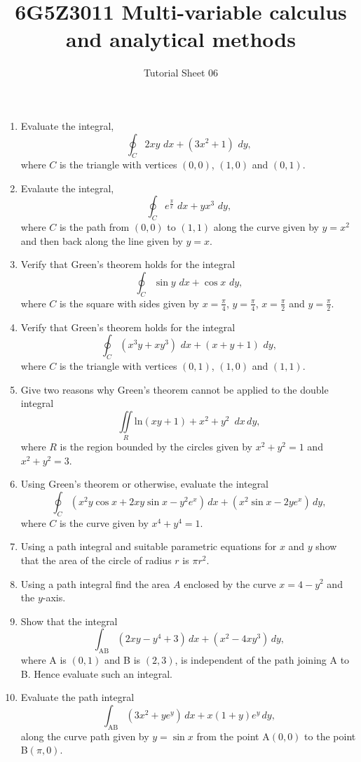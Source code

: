 \documentclass[a4paper]{amsart}
\begin{document}
\title{6G5Z3011 Multi-variable calculus and analytical methods}
\author{Tutorial Sheet 06}
\maketitle

\begin{enumerate}
    \item
    Evaluate the integral,
    $$ \oint_{C} 2xy \, \, dx + \left ( 3x^2 + 1 \right ) \, \, dy ,$$
    where $C$ is the triangle with vertices $(0,0)$, $(1,0)$ and $(0,1)$.
    \item
    Evalaute the integral,
    $$ \oint_{C} e^{\frac{y}{x}}  \, \, dx + y x^3 \, \, dy ,$$
    where $C$ is the path from $(0,0)$ to $(1,1)$ along the curve given by $y=x^2$ and then back along the line given by $y=x$.
    \item
    Verify that Green's theorem holds for the integral
    $$ \oint_{C} \sin y \, \, dx + \cos x \, \, dy ,$$
    where $C$ is the square with sides given by $x=\frac{\pi}{4}$, $y=\frac{\pi}{4}$, $x=\frac{\pi}{2}$ and $y=\frac{\pi}{2}$.
    \item
    Verify that Green's theorem holds for the integral
    $$ \oint_{C} \left ( x^3 y + x y^3 \right ) \, \, dx + (x + y+ 1) \, \, dy ,$$
    where $C$ is the triangle with vertices $(0,1)$, $(1,0)$ and $(1,1)$.
    \item
    Give two reasons why Green's theorem cannot be applied to the double integral
    $$\iint\limits_{R} \text{ln} (xy + 1) + x^2 + y^2  \, \, \, dx \, dy ,$$
    where $R$ is the region bounded by the circles given by $x^2 + y^2=1$ and $x^2 + y^2 = 3$.
    \item
    Using Green's theorem or otherwise, evaluate the integral
    $$\oint_{C} \left ( x^2 y \cos x + 2xy \sin x - y^2 e^x \right ) \,  dx + \left ( x^2 \sin x - 2y e^x \right ) \, dy ,$$
    where $C$ is the curve given by $x^4 + y^4 = 1$.
    \item
    Using a path integral and suitable parametric equations for $x$ and $y$ show that the area of the circle of radius $r$ is $\pi r^2$.
    \item
    Using a path integral find the area $A$ enclosed by the curve $x=4 - y^2$ and the $y$-axis.
    \item
    Show that the integral
    $$ \int_{\text{AB}} \left ( 2xy - y^4 + 3 \right )  \, dx + \left ( x^2 - 4xy^3 \right )  \, dy ,$$
    where A is $(0,1)$ and B is $(2,3)$, is independent of the path joining A to B. Hence evaluate such an integral.
    \item
    Evaluate the path integral 
    $$ \int_{\text{AB}} \left ( 3x^2 + ye^y \right ) \, dx + x(1+y)e^y \, dy ,$$
    along the curve path given by $y=\sin x$ from the point A$(0,0)$ to the point B$(\pi, 0)$.
\end{enumerate}
\end{document}
